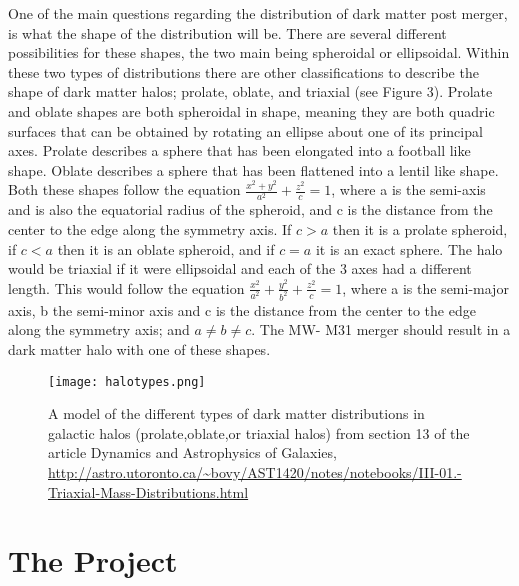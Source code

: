 \documentclass{aastex63}
\begin{document}
One of the main questions regarding the distribution of dark matter post merger, is what the shape of the distribution will be. There are several different possibilities for these shapes, the two main being spheroidal or ellipsoidal. Within these two types of distributions there are other classifications to describe the shape of dark matter halos; prolate, oblate, and triaxial (see Figure 3). Prolate and oblate shapes are both spheroidal in shape, meaning they are both quadric surfaces that can be obtained by rotating an ellipse about one of its principal axes. Prolate describes a sphere that has been elongated into a football like shape. Oblate describes a sphere that has been flattened into a lentil like shape. Both these shapes follow the equation \(\frac{x^2 + y^2}{a^2} +\frac{z^2}{c} = 1\), where a is the semi-axis and is also the equatorial radius of the spheroid, and c is the distance from the center to the edge along the symmetry axis. If $c>a$ then it is a prolate spheroid, if $c<a$ then it is an oblate spheroid, and if $c=a$ it is an exact sphere. The halo would be triaxial if it were ellipsoidal and each of the 3 axes had a different length. This would follow the equation \(\frac{x^2 }{a^2} +\frac{y^2 }{b^2}+\frac{z^2}{c} = 1\), where a is the semi-major axis, b the semi-minor axis and c is the distance from the center to the edge along the symmetry axis; and $a \neq b \neq c$. \cite{Bovy_2017} The MW- M31 merger should result in a dark matter halo with one of these shapes.

\begin{figure}[ht!]
\begin{center}
\texttt{[image: halotypes.png]}
\caption{\label{fig:3}A model of the different types of dark matter distributions in galactic halos (prolate,oblate,or triaxial halos) from section 13 of the article Dynamics and Astrophysics of Galaxies, \url{http://astro.utoronto.ca/~bovy/AST1420/notes/notebooks/III-01.-Triaxial-Mass-Distributions.html} }
\end{center}
\end{figure}


\section{The Project} 

\end{document}
